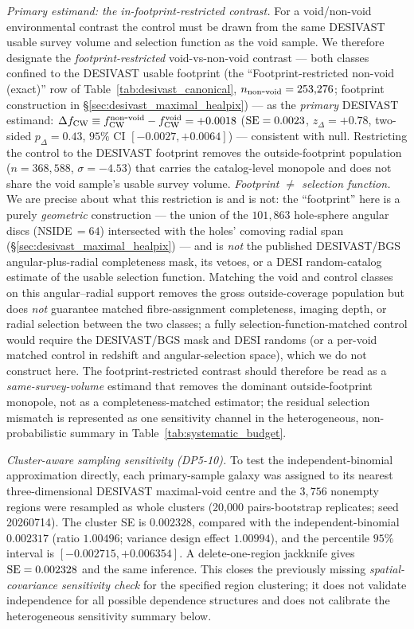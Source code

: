 \documentclass[aps,prd,twocolumn,superscriptaddress,showpacs,preprintnumbers,nofootinbib,longbibliography,floatfix]{revtex4-2}
\begin{document}
\emph{Primary estimand: the in-footprint-restricted contrast.} For a
void/non-void environmental contrast the control must be drawn from the
same DESIVAST usable survey volume and selection function as the void
sample. We therefore designate the \emph{footprint-restricted}
void-vs-non-void contrast --- both classes confined to the DESIVAST
usable footprint (the ``Footprint-restricted non-void (exact)'' row of
Table~\ref{tab:desivast_canonical}, $n_{\rm non\mbox{-}void} =
253{,}276$; footprint construction in \S\ref{sec:desivast_maximal_healpix})
--- as the \emph{primary} DESIVAST estimand:
$\Delta f_{\rm CW} \equiv f_{\rm CW}^{\rm non\mbox{-}void}
- f_{\rm CW}^{\rm void} = +0.0018$ (${\rm SE} = 0.0023$,
$z_\Delta = +0.78$, two-sided $p_\Delta = 0.43$, $95\%$ CI
$[-0.0027, +0.0064]$) --- consistent with null. Restricting the control
to the DESIVAST footprint removes the outside-footprint population
($n = 368{,}588$, $\sigma = -4.53$) that carries the catalog-level
monopole and does not share the void sample's usable survey volume.
\emph{Footprint $\neq$ selection function.} We are precise about what
this restriction is and is not: the ``footprint'' here is a purely
\emph{geometric} construction --- the union of the $101{,}863$
hole-sphere angular discs (NSIDE\,$=\!64$) intersected with the holes'
comoving radial span (\S\ref{sec:desivast_maximal_healpix}) --- and is
\emph{not} the published DESIVAST/BGS angular-plus-radial completeness
mask, its vetoes, or a DESI random-catalog estimate of the usable
selection function. Matching the void and control classes on this
angular--radial support removes the gross outside-coverage population but
does \emph{not} guarantee matched fibre-assignment completeness, imaging
depth, or radial selection between the two classes; a fully
selection-function-matched control would require the DESIVAST/BGS mask and
DESI randoms (or a per-void matched control in redshift and
angular-selection space), which we do not construct here. The
footprint-restricted contrast should therefore be read as a
\emph{same-survey-volume} estimand that removes the dominant
outside-footprint monopole, not as a completeness-matched estimator;
the residual selection mismatch is represented as one sensitivity channel
in the heterogeneous, non-probabilistic summary in
Table~\ref{tab:systematic_budget}.

\emph{Cluster-aware sampling sensitivity (DP5-10).} To test the
independent-binomial approximation directly, each primary-sample galaxy
was assigned to its nearest three-dimensional DESIVAST maximal-void
centre and the $3{,}756$ nonempty regions were resampled as whole
clusters (20,000 pairs-bootstrap replicates; seed 20260714). The cluster
SE is $0.002328$, compared with the independent-binomial $0.002317$
(ratio $1.00496$; variance design effect $1.00994$), and the percentile
$95\%$ interval is $[-0.002715,+0.006354]$. A delete-one-region
jackknife gives ${\rm SE}=0.002328$ and the same inference. This closes
the previously missing \emph{spatial-covariance sensitivity check} for
the specified region clustering; it does not validate independence for
all possible dependence structures and does not calibrate the
heterogeneous sensitivity summary below.
\end{document}
